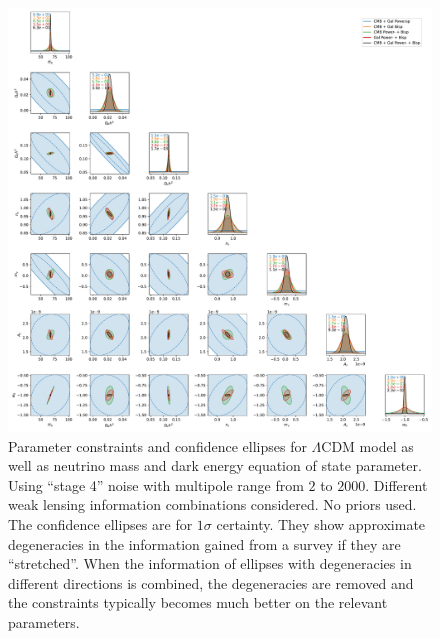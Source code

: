 \documentclass[11pt]{article} %
\begin{document}
\begin{figure}
    \centering
    \includegraphics[width=\textwidth]{figures/param_constraints_all.pdf}
    \caption{Parameter constraints and confidence ellipses for $\Lambda$CDM model as well as neutrino mass and dark energy equation of state parameter. Using ``stage 4'' noise with multipole range from $2$ to $2000$. Different weak lensing information combinations considered. No priors used. The confidence ellipses are for $1\sigma$ certainty. They show approximate degeneracies in the information gained from a survey if they are ``stretched''. When the information of ellipses with degeneracies in different directions is combined, the degeneracies are removed and the constraints typically becomes much better on the relevant parameters.}
    \label{fig:paramconstraintsall}
\end{figure}

\end{document}
